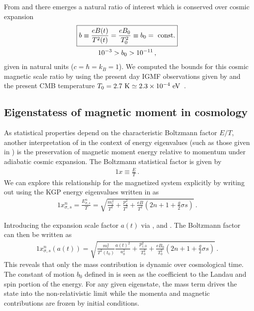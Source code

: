 From  and  there emerges a natural ratio of interest which is conserved over cosmic expansion 
\begin{gather}
 \label{tbscale}
 \boxed{b\equiv\frac{e{B}(t)}{T^{2}(t)}=\frac{e{B}_{0}}{T_{0}^{2}}\equiv b_0={\rm\ const.}}\\
 10^{-3}>b_{0}>10^{-11}\,,
\end{gather}
given in natural units ($c=\hbar=k_{B}=1$). We computed the bounds for this cosmic magnetic scale ratio by using the present day IGMF observations given by  and the present CMB temperature $T_{0}=2.7{\rm\ K}\simeq2.3\times10^{-4}\eV$~\citep{Planck:2018vyg}.

\subsection{Eigenstatess of magnetic moment in cosmology}
\label{sec:protection}

As statistical properties depend on the characteristic Boltzmann factor $E/T$, another interpretation of  in the context of energy eigenvalues (such as those given in ) is the preservation of magnetic moment energy relative to momentum under adiabatic cosmic expansion. The Boltzmann statistical factor is given by
\begin{alignat}{1}
    \label{Boltz} x\equiv\frac{E}{T}\,.
\end{alignat}
We can explore this relationship for the magnetized system explicitly by writing out  using the KGP energy eigenvalues written in  as
\begin{alignat}{1}
    \label{XExplicit} x_{\sigma,s}^{n} = \frac{E_{\sigma,s}^{n}}{T} = \sqrt{\frac{m_{e}^{2}}{T^{2}}+\frac{p_{z}^{2}}{T^{2}}+\frac{eB}{T^{2}}\left(2n+1+\frac{g}{2}\sigma s\right)}\,.
\end{alignat}

Introducing the expansion scale factor $a(t)$ via ,  and . The Boltzmann factor can then be written as
\begin{alignat}{1}
    \label{xscale:1} x_{\sigma,s}^{n}(a(t)) = \sqrt{\frac{m_{e}^{2}}{T^{2}(t_{0})}\frac{a(t)^{2}}{a_{0}^{2}}+\frac{p_{z,0}^{2}}{T_{0}^{2}}+\frac{eB_{0}}{T_{0}^{2}}\left(2n+1+\frac{g}{2}\sigma s\right)}\,.
\end{alignat}
This reveals that only the mass contribution is dynamic over cosmological time. The constant of motion $b_{0}$ defined in  is seen as the coefficient to the Landau and spin portion of the energy. For any given eigenstate, the mass term drives the state into the non-relativistic limit while the momenta and magnetic contributions are frozen by initial conditions. 

